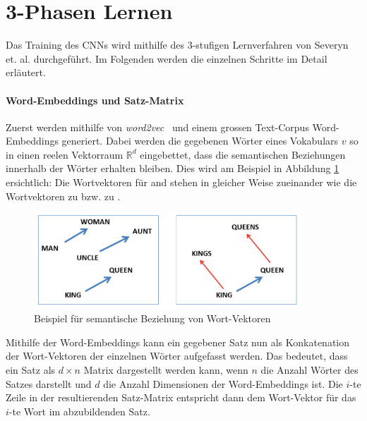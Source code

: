 \section{3-Phasen Lernen}
Das Training des CNNs wird mithilfe des 3-stufigen Lernverfahren von Severyn et. al. \cite{Severyn:2015kta} durchgeführt. Im Folgenden werden die einzelnen Schritte im Detail erläutert.

\paragraph{Word-Embeddings und Satz-Matrix} Zuerst werden mithilfe von \emph{word2vec}~\cite{mikolov2013distributed} und einem grossen Text-Corpus Word-Embeddings generiert. Dabei werden die gegebenen Wörter eines Vokabulars $v$ so in einen reelen Vektorraum $\mathbb{R}^d$ eingebettet, dass die semantischen Beziehungen innerhalb der Wörter erhalten bleiben. Dies wird am Beispiel in Abbildung \ref{fig:king_queen_example} ersichtlich: Die Wortvektoren für  and  stehen in gleicher Weise zueinander wie die Wortvektoren  zu  bzw.  zu .

\begin{figure}[H]
  \label{fig:king_queen_example}
  \centering
  \includegraphics[width=10cm]{img/king_queen_example_word_embeddings}
  \caption{Beispiel für semantische Beziehung von Wort-Vektoren}
\end{figure}

Mithilfe der Word-Embeddings kann ein gegebener Satz nun als Konkatenation der Wort-Vektoren der einzelnen Wörter aufgefasst werden. Das bedeutet, dass ein Satz als $d \times n$ Matrix dargestellt werden kann, wenn $n$ die Anzahl Wörter des Satzes darstellt und $d$ die Anzahl Dimensionen der Word-Embeddings ist. Die $i$-te Zeile in der resultierenden Satz-Matrix entspricht dann dem Wort-Vektor für das $i$-te Wort im abzubildenden Satz.

